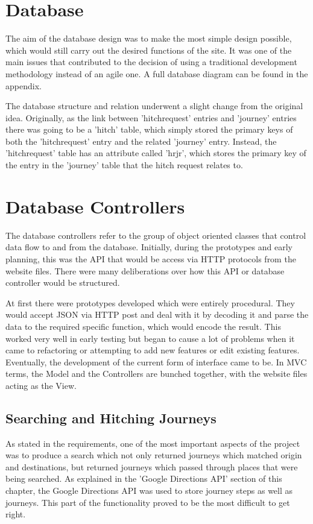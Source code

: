 \section{Database}	

The aim of the database design was to make the most simple design possible, which would still carry out the desired functions of the site. It was one of the main issues that contributed to the decision of using a traditional development methodology instead of an agile one. A full database diagram can be found in the appendix.

The database structure and relation underwent a slight change from the original idea. Originally, as the link between 'hitch\textunderscore request' entries and 'journey' entries there was going to be a 'hitch' table, which simply stored the primary keys of both the 'hitch\textunderscore request' entry and the related 'journey' entry. Instead, the 'hitch\textunderscore request' table has an attribute called 'hr\textunderscore jr', which stores the primary key of the entry in the 'journey' table that the hitch request relates to.
	
\section{Database Controllers}
	The database controllers refer to the group of object oriented classes that control data flow to and from the database. Initially, during the prototypes and early planning, this was the API that would be access via HTTP protocols from the website files. There were many deliberations over how this API or database controller would be structured.
	
	At first there were prototypes developed which were entirely procedural. They would accept JSON via HTTP post and deal with it by decoding it and parse the data to the required specific function, which would encode the result. This worked very well in early testing but began to cause a lot of problems when it came to refactoring or attempting to add new features or edit existing features. Eventually, the development of the current form of interface came to be. In MVC terms, the Model and the Controllers are bunched together, with the website files acting as the View.

\subsection{Searching and Hitching Journeys}
As stated in the requirements, one of the most important aspects of the project was to produce a search which not only returned journeys which matched origin and destinations, but returned journeys which passed through places that were being searched. As explained in the 'Google Directions API' section of this chapter, the Google Directions API was used to store journey steps as well as journeys. This part of the functionality proved to be the most difficult to get right.

